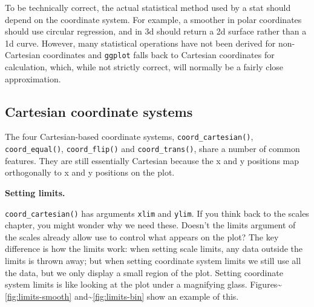 To be technically correct, the actual statistical method used by a stat
should depend on the coordinate system. For example, a smoother in polar
coordinates should use circular regression, and in 3d should return a 2d
surface rather than a 1d curve. However, many statistical operations
have not been derived for non-Cartesian coordinates and \texttt{ggplot}
falls back to Cartesian coordinates for calculation, which, while not
strictly correct, will normally be a fairly close approximation.

\subsection{Cartesian coordinate systems}\label{sub:cartesian}

The four Cartesian-based coordinate systems,
\texttt{coord\_cartesian()}, \texttt{coord\_equal()},
\texttt{coord\_flip()} and \texttt{coord\_trans()}, share a number of
common features. They are still essentially Cartesian because the x and
y positions map orthogonally to x and y positions on the plot.
 

\textbf{Setting limits.}

\texttt{coord\_cartesian()} has arguments \texttt{xlim} and
\texttt{ylim}. If you think back to the scales chapter, you might wonder
why we need these. Doesn't the limits argument of the scales already
allow use to control what appears on the plot? The key difference is how
the limits work: when setting scale limits, any data outside the limits
is thrown away; but when setting coordinate system limits we still use
all the data, but we only display a small region of the plot. Setting
coordinate system limits is like looking at the plot under a magnifying
glass. Figures\textasciitilde{}\ref{fig:limits-smooth}
and\textasciitilde{}\ref{fig:limits-bin} show an example of this.
 

\begin{Shaded}
\begin{Highlighting}[]
\StringTok{ }\StringTok{ }\NormalTok{())}
\end{Highlighting}
\end{Shaded}

